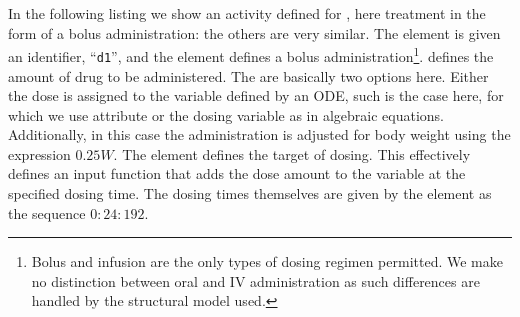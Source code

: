 

In the following listing 
 we show an activity defined for ,
here treatment in the form of a bolus administration: the others are very similar.
The  element is given an identifier, ``\texttt{d1}'',
and the element  defines a
bolus administration\footnote{Bolus and infusion are the only types of
dosing regimen permitted. We make no distinction between oral and IV
administration as such differences are handled by the structural
model used.}.   defines the amount of drug to be
administered. The are basically two options here. Either the dose is assigned
to the variable defined by an ODE, such is the case here, for which we use
 attribute or the dosing variable  as in algebraic
equations. 
Additionally, in this case the administration is adjusted for body
weight using the expression $0.25W$. The element 
defines the target of dosing. This effectively defines an input
function that adds the dose amount
to the variable  at the specified dosing time. The dosing
times themselves are given by the  element as the
sequence $0:24:192$.



